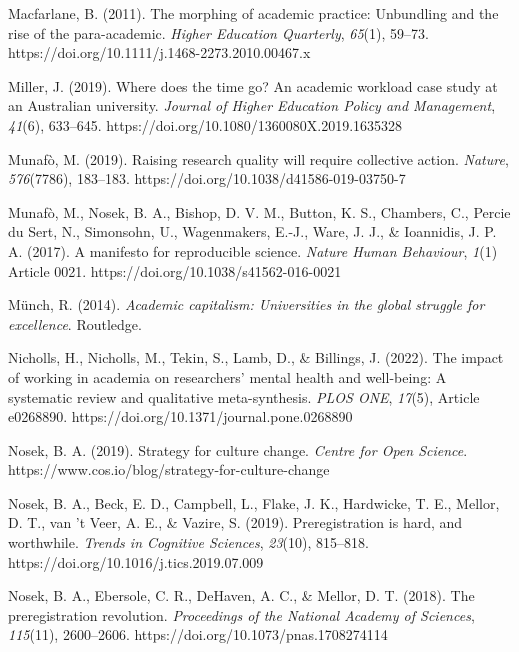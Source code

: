 \documentclass[meta, authordate]{jote-new-article}
\begin{document}
Macfarlane, B. (2011). The morphing of academic practice: Unbundling and the rise of the para-academic. \emph{Higher Education Quarterly}, \emph{65}(1), 59–73. https://doi.org/10.1111/j.1468-2273.2010.00467.x



Miller, J. (2019). Where does the time go? An academic workload case study at an Australian university. \emph{Journal of Higher Education Policy and Management}, \emph{41}(6), 633–645. https://doi.org/10.1080/1360080X.2019.1635328



Munafò, M. (2019). Raising research quality will require collective action. \emph{Nature}, \emph{576}(7786), 183–183. https://doi.org/10.1038/d41586-019-03750-7



Munafò, M., Nosek, B. A., Bishop, D. V. M., Button, K. S., Chambers, C., Percie du Sert, N., Simonsohn, U., Wagenmakers, E.-J., Ware, J. J., & Ioannidis, J. P. A. (2017). A manifesto for reproducible science. \emph{Nature Human Behaviour}, \emph{1}(1) Article 0021. https://doi.org/10.1038/s41562-016-0021



Münch, R. (2014). \emph{Academic capitalism: Universities in the global struggle for excellence}. Routledge.



Nicholls, H., Nicholls, M., Tekin, S., Lamb, D., & Billings, J. (2022). The impact of working in academia on researchers’ mental health and well-being: A systematic review and qualitative meta-synthesis. \emph{PLOS ONE}, \emph{17}(5), Article e0268890. https://doi.org/10.1371/journal.pone.0268890



Nosek, B. A. (2019). Strategy for culture change. \emph{Centre for Open Science}. https://www.cos.io/blog/strategy-for-culture-change



Nosek, B. A., Beck, E. D., Campbell, L., Flake, J. K., Hardwicke, T. E., Mellor, D. T., van ’t Veer, A. E., & Vazire, S. (2019). Preregistration is hard, and worthwhile. \emph{Trends in Cognitive Sciences}, \emph{23}(10), 815–818. https://doi.org/10.1016/j.tics.2019.07.009



Nosek, B. A., Ebersole, C. R., DeHaven, A. C., & Mellor, D. T. (2018). The preregistration revolution. \emph{Proceedings of the National Academy of Sciences}, \emph{115}(11), 2600–2606. https://doi.org/10.1073/pnas.1708274114
\end{document}
